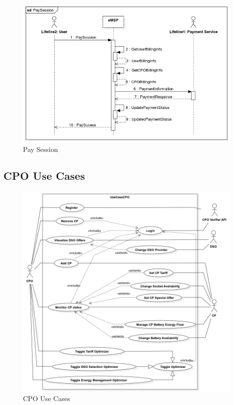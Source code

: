 \documentclass{Configuration_Files/PoliMi3i_thesis}
\begin{document}
\begin{figure}[H]
    \centering
    \includegraphics[width=1\textwidth]{Images/UseCases/PaySession.jpg}
    \caption{Pay Session}
\end{figure}

\subsection{CPO Use Cases}
\begin{figure}[H]
    \centering
    \includegraphics[width=1\textwidth]{Images/UseCases/CPOUseCases.jpg}
    \caption{CPO Use Cases}
\end{figure}
\end{document}

